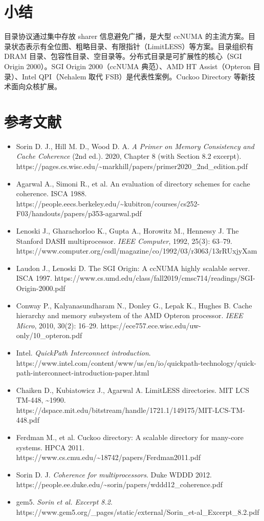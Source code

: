 \section{小结}

目录协议通过集中存放 sharer 信息避免广播，是大型 ccNUMA 的主流方案。目录状态表示有全位图、粗略目录、有限指针（LimitLESS）等方案。目录组织有 DRAM 目录、包容性目录、空目录等。分布式目录是可扩展性的核心（SGI Origin 2000）。SGI Origin 2000（ccNUMA 典范）、AMD HT Assist（Opteron 目录）、Intel QPI（Nehalem 取代 FSB）是代表性案例。Cuckoo Directory 等新技术面向众核扩展。

\section*{参考文献}
\begin{itemize}
\item Sorin D. J., Hill M. D., Wood D. A. \emph{A Primer on Memory Consistency and Cache Coherence} (2nd ed.). 2020, Chapter 8 (with Section 8.2 excerpt). https://pages.cs.wisc.edu/\textasciitilde{}markhill/papers/primer2020\_2nd\_edition.pdf
\item Agarwal A., Simoni R., et al. An evaluation of directory schemes for cache coherence. ISCA 1988. https://people.eecs.berkeley.edu/\textasciitilde{}kubitron/courses/cs252-F03/handouts/papers/p353-agarwal.pdf
\item Lenoski J., Gharachorloo K., Gupta A., Horowitz M., Hennessy J. The Stanford DASH multiprocessor. \emph{IEEE Computer}, 1992, 25(3): 63–79. https://www.computer.org/csdl/magazine/co/1992/03/r3063/13rRUxjyXam
\item Laudon J., Lenoski D. The SGI Origin: A ccNUMA highly scalable server. ISCA 1997. https://www.cs.umd.edu/class/fall2019/cmsc714/readings/SGI-Origin-2000.pdf
\item Conway P., Kalyanasundharam N., Donley G., Lepak K., Hughes B. Cache hierarchy and memory subsystem of the AMD Opteron processor. \emph{IEEE Micro}, 2010, 30(2): 16–29. https://ece757.ece.wisc.edu/uw-only/10\_opteron.pdf
\item Intel. \emph{QuickPath Interconnect introduction}. https://www.intel.com/content/www/us/en/io/quickpath-technology/quick-path-interconnect-introduction-paper.html
\item Chaiken D., Kubiatowicz J., Agarwal A. LimitLESS directories. MIT LCS TM-448, \textasciitilde{}1990. https://dspace.mit.edu/bitstream/handle/1721.1/149175/MIT-LCS-TM-448.pdf
\item Ferdman M., et al. Cuckoo directory: A scalable directory for many-core systems. HPCA 2011. https://www.cs.cmu.edu/\textasciitilde{}18742/papers/Ferdman2011.pdf
\item Sorin D. J. \emph{Coherence for multiprocessors}. Duke WDDD 2012. https://people.ee.duke.edu/\textasciitilde{}sorin/papers/wddd12\_coherence.pdf
\item gem5. \emph{Sorin et al. Excerpt 8.2}. https://www.gem5.org/\_pages/static/external/Sorin\_et-al\_Excerpt\_8.2.pdf
\end{itemize}
